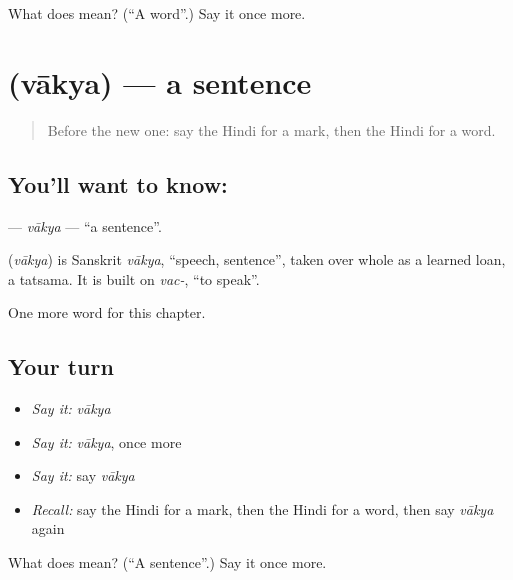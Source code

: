 \begin{tcolorbox}[breakable,colback=teal!4,colframe=teal!35!black,title={Before you move on}]
What does  mean? (\textquotedblleft{}A word\textquotedblright{}.) Say it once more.
\end{tcolorbox}
\section[\texorpdfstring{\hi{वाक्य} (vākya)}{वाक्य (vākya)}]{ (vākya) — a sentence}

\label{lesson:HI-C198-vakya}



\begin{quote}
Before the new one: say the Hindi for a mark, then the Hindi for a word.
\end{quote}

\subsection*{You'll want to know: }
\textbf{} — \emph{vākya} — \textquotedblleft{}a sentence\textquotedblright{}.

\begin{cousinweb}
\textbf{} (\emph{vākya}) is Sanskrit \emph{vākya}, \textquotedblleft{}speech, sentence\textquotedblright{}, taken over whole as a learned loan, a tatsama. It is built on \emph{vac-}, \textquotedblleft{}to speak\textquotedblright{}.
\end{cousinweb}

\begin{grammarlens}[title={What you've built}]
One more word for this chapter.
\end{grammarlens}

\subsection*{Your turn}
\begin{itemize}
\raggedright
  \item \emph{Say it:} \emph{vākya}
  \item \emph{Say it:} \emph{vākya}, once more
  \item \emph{Say it:} say \emph{vākya}
  \item \emph{Recall:} say the Hindi for a mark, then the Hindi for a word, then say \emph{vākya} again
\end{itemize}

\begin{tcolorbox}[breakable,colback=teal!4,colframe=teal!35!black,title={Before you move on}]
What does  mean? (\textquotedblleft{}A sentence\textquotedblright{}.) Say it once more.
\end{tcolorbox}
